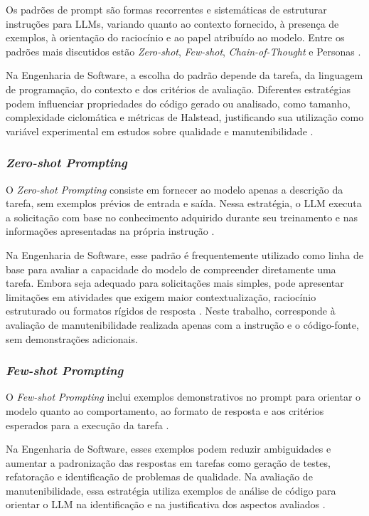 Os padrões de prompt são formas recorrentes e sistemáticas de estruturar instruções para LLMs, variando quanto ao contexto fornecido, à presença de exemplos, à orientação do raciocínio e ao papel atribuído ao modelo. Entre os padrões mais discutidos estão \textit{Zero-shot}, \textit{Few-shot}, \textit{Chain-of-Thought} e Personas \cite{DellaPortaEtAll}.

Na Engenharia de Software, a escolha do padrão depende da tarefa, da linguagem de programação, do contexto e dos critérios de avaliação. Diferentes estratégias podem influenciar propriedades do código gerado ou analisado, como tamanho, complexidade ciclomática e métricas de Halstead, justificando sua utilização como variável experimental em estudos sobre qualidade e manutenibilidade \cite{DellaPortaEtAll,MartinezEtAll}.

\subsubsection{\textit{Zero-shot Prompting}}

O \textit{Zero-shot Prompting} consiste em fornecer ao modelo apenas a descrição da tarefa, sem exemplos prévios de entrada e saída. Nessa estratégia, o LLM executa a solicitação com base no conhecimento adquirido durante seu treinamento e nas informações apresentadas na própria instrução \cite{alomari2026}.

Na Engenharia de Software, esse padrão é frequentemente utilizado como linha de base para avaliar a capacidade do modelo de compreender diretamente uma tarefa. Embora seja adequado para solicitações mais simples, pode apresentar limitações em atividades que exigem maior contextualização, raciocínio estruturado ou formatos rígidos de resposta \cite{OuedraogoEtAll}. Neste trabalho, corresponde à avaliação de manutenibilidade realizada apenas com a instrução e o código-fonte, sem demonstrações adicionais.

\subsubsection{\textit{Few-shot Prompting}}

O \textit{Few-shot Prompting} inclui exemplos demonstrativos no prompt para orientar o modelo quanto ao comportamento, ao formato de resposta e aos critérios esperados para a execução da tarefa \cite{alomari2026}.

Na Engenharia de Software, esses exemplos podem reduzir ambiguidades e aumentar a padronização das respostas em tarefas como geração de testes, refatoração e identificação de problemas de qualidade. Na avaliação de manutenibilidade, essa estratégia utiliza exemplos de análise de código para orientar o LLM na identificação e na justificativa dos aspectos avaliados \cite{OuedraogoEtAll,MartinezEtAll}.

